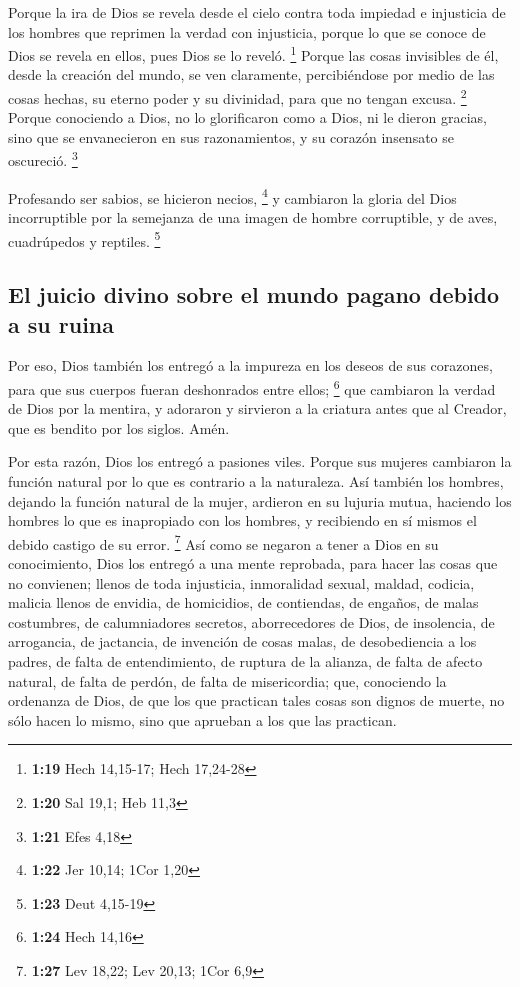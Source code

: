 \begin{paracol}{2}
 Porque la ira de Dios se revela desde el cielo contra
toda impiedad e injusticia de los hombres que reprimen la verdad con
injusticia,  porque lo que se conoce de Dios se revela en
ellos, pues Dios se lo reveló. \footnote{\textbf{1:19} Hech 14,15-17;
  Hech 17,24-28}  Porque las cosas invisibles de él,
desde la creación del mundo, se ven claramente, percibiéndose por medio
de las cosas hechas, su eterno poder y su divinidad, para que no tengan
excusa. \footnote{\textbf{1:20} Sal 19,1; Heb 11,3} 
Porque conociendo a Dios, no lo glorificaron como a Dios, ni le dieron
gracias, sino que se envanecieron en sus razonamientos, y su corazón
insensato se oscureció. \footnote{\textbf{1:21} Efes 4,18}

 Profesando ser sabios, se hicieron necios, \footnote{\textbf{1:22}
  Jer 10,14; 1Cor 1,20}  y cambiaron la gloria del Dios
incorruptible por la semejanza de una imagen de hombre corruptible, y de
aves, cuadrúpedos y reptiles. \footnote{\textbf{1:23} Deut 4,15-19}

\hypertarget{el-juicio-divino-sobre-el-mundo-pagano-debido-a-su-ruina}{%
\subsection{El juicio divino sobre el mundo pagano debido a su
ruina}\label{el-juicio-divino-sobre-el-mundo-pagano-debido-a-su-ruina}}

 Por eso, Dios también los entregó a la impureza en los
deseos de sus corazones, para que sus cuerpos fueran deshonrados entre
ellos; \footnote{\textbf{1:24} Hech 14,16}  que cambiaron
la verdad de Dios por la mentira, y adoraron y sirvieron a la criatura
antes que al Creador, que es bendito por los siglos. Amén.

 Por esta razón, Dios los entregó a pasiones viles.
Porque sus mujeres cambiaron la función natural por lo que es contrario
a la naturaleza.  Así también los hombres, dejando la
función natural de la mujer, ardieron en su lujuria mutua, haciendo los
hombres lo que es inapropiado con los hombres, y recibiendo en sí mismos
el debido castigo de su error. \footnote{\textbf{1:27} Lev 18,22; Lev
  20,13; 1Cor 6,9}  Así como se negaron a tener a Dios en
su conocimiento, Dios los entregó a una mente reprobada, para hacer las
cosas que no convienen;  llenos de toda injusticia,
inmoralidad sexual, maldad, codicia, malicia llenos de envidia, de
homicidios, de contiendas, de engaños, de malas costumbres, de
calumniadores secretos,  aborrecedores de Dios, de
insolencia, de arrogancia, de jactancia, de invención de cosas malas, de
desobediencia a los padres,  de falta de entendimiento,
de ruptura de la alianza, de falta de afecto natural, de falta de
perdón, de falta de misericordia;  que, conociendo la
ordenanza de Dios, de que los que practican tales cosas son dignos de
muerte, no sólo hacen lo mismo, sino que aprueban a los que las
practican.


\end{paracol}

